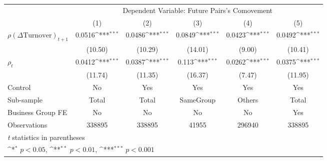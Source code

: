 {
\def\sym#1{\ifmmode^{#1}\else\(^{#1}\)\fi}
\begin{tabular}{l*{5}{c}}
\hline\hline
                    &\multicolumn{5}{c}{Dependent Variable:  Future Pairs's Comovement}                                           \\\cmidrule(lr){2-6}
                    &\multicolumn{1}{c}{(1)}         &\multicolumn{1}{c}{(2)}         &\multicolumn{1}{c}{(3)}         &\multicolumn{1}{c}{(4)}         &\multicolumn{1}{c}{(5)}         \\
\hline
 $ {\rho(\Delta \text{Turnover})_{t+1}} $ &      0.0516\sym{***}&      0.0486\sym{***}&      0.0849\sym{***}&      0.0423\sym{***}&      0.0492\sym{***}\\
                    &     (10.50)         &     (10.29)         &     (14.01)         &      (9.00)         &     (10.41)         \\
[1em]
 $ {\rho_t} $       &      0.0412\sym{***}&      0.0387\sym{***}&       0.113\sym{***}&      0.0262\sym{***}&      0.0375\sym{***}\\
                    &     (11.74)         &     (11.35)         &     (16.37)         &      (7.47)         &     (11.95)         \\
\hline
Control             &          No         &         Yes         &         Yes         &         Yes         &         Yes         \\
Sub-sample          &       Total         &       Total         &   SameGroup         &      Others         &       Total         \\
Business Group FE   &          No         &          No         &          No         &          No         &         Yes         \\
Observations        &      338895         &      338895         &       41955         &      296940         &      338895         \\
\hline\hline
\multicolumn{6}{l}{\footnotesize \textit{t} statistics in parentheses}\\
\multicolumn{6}{l}{\footnotesize \sym{*} \(p<0.05\), \sym{**} \(p<0.01\), \sym{***} \(p<0.001\)}\\
\end{tabular}
}
